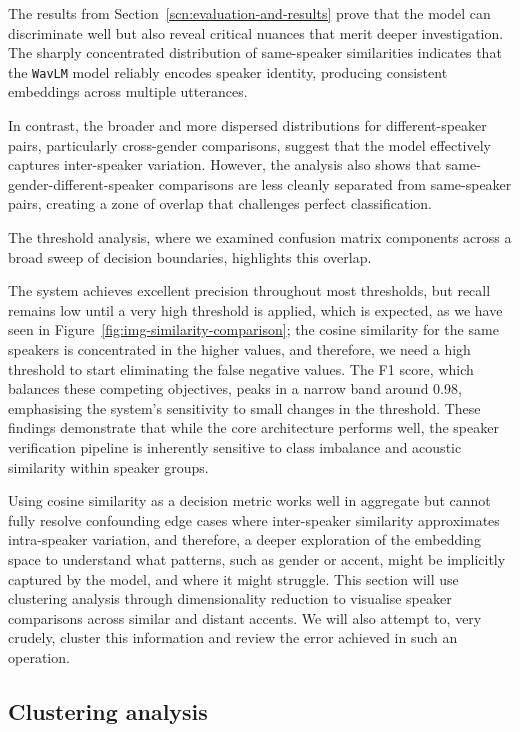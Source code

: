 \documentclass[conference]{IEEEtran}
\begin{document}
	The results from Section~\ref{scn:evaluation-and-results} prove that the model can discriminate well but also reveal critical nuances that merit deeper investigation. The sharply concentrated distribution of same-speaker similarities indicates that the \texttt{WavLM} model reliably encodes speaker identity, producing consistent embeddings across multiple utterances.
	
	In contrast, the broader and more dispersed distributions for different-speaker pairs, particularly cross-gender comparisons, suggest that the model effectively captures inter-speaker variation. However, the analysis also shows that same-gender-different-speaker comparisons are less cleanly separated from same-speaker pairs, creating a zone of overlap that challenges perfect classification.
	
	The threshold analysis, where we examined confusion matrix components across a broad sweep of decision boundaries, highlights this overlap. 
	
	The system achieves excellent precision throughout most thresholds, but recall remains low until a very high threshold is applied, which is expected, as we have seen in Figure~\ref{fig:img-similarity-comparison}; the cosine similarity for the same speakers is concentrated in the higher values, and therefore, we need a high threshold to start eliminating the false negative values. The F1 score, which balances these competing objectives, peaks in a narrow band around 0.98, emphasising the system's sensitivity to small changes in the threshold. These findings demonstrate that while the core architecture performs well, the speaker verification pipeline is inherently sensitive to class imbalance and acoustic similarity within speaker groups. 
	
	Using cosine similarity as a decision metric works well in aggregate but cannot fully resolve confounding edge cases where inter-speaker similarity approximates intra-speaker variation, and therefore, a deeper exploration of the embedding space to understand what patterns, such as gender or accent, might be implicitly captured by the model, and where it might struggle. This section will use clustering analysis through dimensionality reduction to visualise speaker comparisons across similar and distant accents. We will also attempt to, very crudely, cluster this information and review the error achieved in such an operation.
	
	\subsection{Clustering analysis}
	
\end{document}
